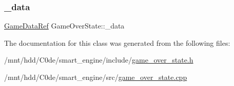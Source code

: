 \subsubsection{\texorpdfstring{\+\_\+data}{\_data}}
{\footnotesize\ttfamily \hyperlink{game_8h_a513c9dd465a0df41dbb4daf40cc717c2}{Game\+Data\+Ref} Game\+Over\+State\+::\+\_\+data\hspace{0.3cm}{\ttfamily [private]}}



The documentation for this class was generated from the following files\+:\begin{DoxyCompactItemize}
\item 
/mnt/hdd/\+C0de/smart\+\_\+engine/include/\hyperlink{game__over__state_8h}{game\+\_\+over\+\_\+state.\+h}\item 
/mnt/hdd/\+C0de/smart\+\_\+engine/src/\hyperlink{game__over__state_8cpp}{game\+\_\+over\+\_\+state.\+cpp}\end{DoxyCompactItemize}
